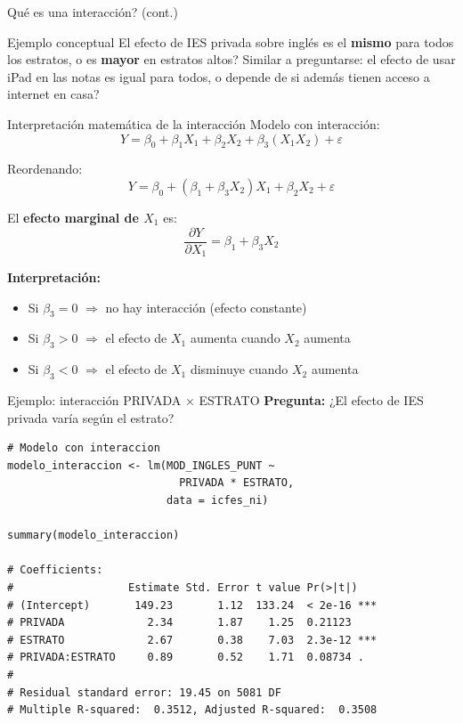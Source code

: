 \documentclass[aspectratio=169, 11pt]{beamer}
\begin{document}
\begin{frame}{\textquestiondown Qu\'e es una interacci\'on? (cont.)}
\begin{exampleblock}{Ejemplo conceptual}
\textquestiondown El efecto de IES privada sobre ingl\'es es el \textbf{mismo} para todos los estratos, o es \textbf{mayor} en estratos altos? Similar a preguntarse: \textquestiondown el efecto de usar iPad en las notas es igual para todos, o depende de si adem\'as tienen acceso a internet en casa?
\end{exampleblock}
\end{frame}

\begin{frame}{Interpretación matemática de la interacción}
Modelo con interacción:
\[
Y = \beta_0 + \beta_1 X_1 + \beta_2 X_2 + \beta_3 (X_1 X_2) + \varepsilon
\]

Reordenando:
\[
Y = \beta_0 + (\beta_1 + \beta_3 X_2) X_1 + \beta_2 X_2 + \varepsilon
\]

\vspace{0.2cm}
El \textbf{efecto marginal de $X_1$} es:
\[
\frac{\partial Y}{\partial X_1} = \beta_1 + \beta_3 X_2
\]

\vspace{0.2cm}
\textbf{Interpretación:}
\begin{itemize}
  \item Si $\beta_3 = 0$ $\Rightarrow$ no hay interacción (efecto constante)
  \item Si $\beta_3 > 0$ $\Rightarrow$ el efecto de $X_1$ aumenta cuando $X_2$ aumenta
  \item Si $\beta_3 < 0$ $\Rightarrow$ el efecto de $X_1$ disminuye cuando $X_2$ aumenta
\end{itemize}
\end{frame}

\begin{frame}[fragile]{Ejemplo: interacción PRIVADA × ESTRATO}
\textbf{Pregunta:} ¿El efecto de IES privada varía según el estrato?

\begin{lstlisting}
# Modelo con interaccion
modelo_interaccion <- lm(MOD_INGLES_PUNT ~
                           PRIVADA * ESTRATO,
                         data = icfes_ni)

summary(modelo_interaccion)

# Coefficients:
#                  Estimate Std. Error t value Pr(>|t|)
# (Intercept)       149.23       1.12  133.24  < 2e-16 ***
# PRIVADA             2.34       1.87    1.25  0.21123
# ESTRATO             2.67       0.38    7.03  2.3e-12 ***
# PRIVADA:ESTRATO     0.89       0.52    1.71  0.08734 .
#
# Residual standard error: 19.45 on 5081 DF
# Multiple R-squared:  0.3512, Adjusted R-squared:  0.3508
\end{lstlisting}
\end{frame}
\end{document}
